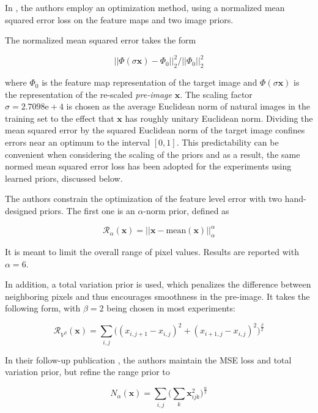 \documentclass{article}
\begin{document}
In \cite{mv15}, the authors employ an optimization method, using a normalized mean squared error loss on the feature maps and two image priors. 

The normalized mean squared error takes the form

\begin{equation}
	|| \Phi(\sigma \mathbf{x}) - \Phi_0 ||_2^2 / ||\Phi_0||^2_2
\end{equation}

where $\Phi_0$ is the feature map representation of the target image and $\Phi(\sigma \mathbf{x})$ is the representation of the re-scaled \textit{pre-image} $\mathbf{x}$. The scaling factor $\sigma = 2.7098\mathrm{e+}4$ is chosen as the average Euclidean norm of natural images in the training set to the effect that $\mathbf{x}$ has roughly unitary Euclidean norm. Dividing the mean squared error by the squared Euclidean norm of the target image confines errors near an optimum to the interval $[0,1]$. This predictability can be convenient when considering the scaling of the priors and as a result, the same normed mean squared error loss has been adopted for the experiments using learned priors, discussed below.

The authors constrain the optimization of the feature level error with two hand-designed priors. The first one is an $\alpha$-norm prior, defined as 

\begin{equation}
\mathcal{R}_\alpha(\mathbf{x}) = ||\mathbf{x} - \mathrm{mean}(\mathbf{x}) ||^\alpha_\alpha
\end{equation}
 
It is meant to limit the overall range of pixel values. Results are reported with $\alpha=6$.

In addition, a total variation prior is used, which penalizes the difference between neighboring pixels and thus encourages smoothness in the pre-image. It takes the following form, with $\beta = 2$ being chosen in most experiments:

\begin{equation}
\mathcal{R}_{V^\beta}(\mathbf{x}) = \sum_{i,j} \big( (x_{i,j+1} - x_{i,j})^2 + (x_{i+1,j} - x_{i,j})^2 \big)^{\frac{\beta}{2}}
\end{equation}


In their follow-up publication \cite{mv16}, the authors maintain the MSE loss and total variation prior, but refine the range prior to

\begin{equation}
	N_\alpha(\mathbf{x}) = \sum_{i,j}\bigg( \sum_{k} \mathbf{x}_{ijk}^2 \bigg)^{\frac{\alpha}{2}}
\end{equation}
\end{document}
